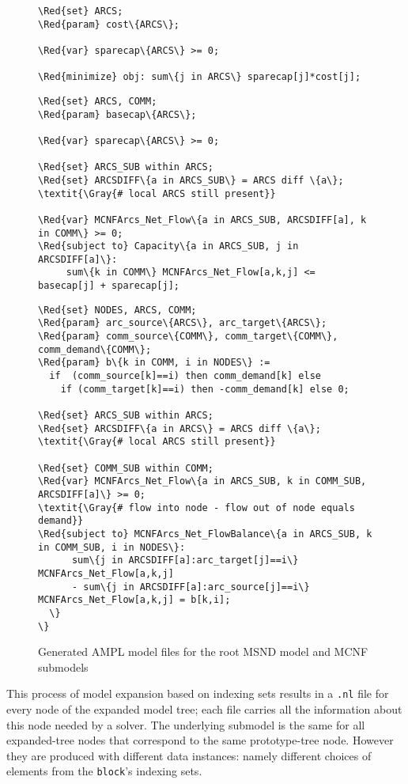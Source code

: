 \documentclass[10pt,a4paper]{book}
\begin{document}
\begin{figure}
{\small
\begin{Verbatim}[frame=single,framerule=0.2pt,framesep=5pt,commandchars=\\\{\}]
%------------------------------- root.mod --------------------------------
\Red{set} ARCS;
\Red{param} cost\{ARCS\};

\Red{var} sparecap\{ARCS\} >= 0;

\Red{minimize} obj: sum\{j in ARCS\} sparecap[j]*cost[j];
\end{Verbatim}
\begin{Verbatim}[frame=single,framerule=0.2pt,framesep=5pt,commandchars=\\\{\}]
% -------------------------- root_MCNFArcs.mod ----------------------------
\Red{set} ARCS, COMM;
\Red{param} basecap\{ARCS\};

\Red{var} sparecap\{ARCS\} >= 0;

\Red{set} ARCS_SUB within ARCS;
\Red{set} ARCSDIFF\{a in ARCS_SUB\} = ARCS diff \{a\};  \textit{\Gray{# local ARCS still present}}

\Red{var} MCNFArcs_Net_Flow\{a in ARCS_SUB, ARCSDIFF[a], k in COMM\} >= 0;
\Red{subject to} Capacity\{a in ARCS_SUB, j in ARCSDIFF[a]\}:
     sum\{k in COMM\} MCNFArcs_Net_Flow[a,k,j] <= basecap[j] + sparecap[j];
\end{Verbatim}
\begin{Verbatim}[frame=single,framerule=0.2pt,framesep=5pt,commandchars=\\\{\}]
% -------------------------- root_MCNFArcs_Net.mod ----------------------------
\Red{set} NODES, ARCS, COMM;
\Red{param} arc_source\{ARCS\}, arc_target\{ARCS\};
\Red{param} comm_source\{COMM\}, comm_target\{COMM\}, comm_demand\{COMM\};
\Red{param} b\{k in COMM, i in NODES\} := 
  if  (comm_source[k]==i) then comm_demand[k] else 
    if (comm_target[k]==i) then -comm_demand[k] else 0;

\Red{set} ARCS_SUB within ARCS;
\Red{set} ARCSDIFF\{a in ARCS\} = ARCS diff \{a\};  \textit{\Gray{# local ARCS still present}}

\Red{set} COMM_SUB within COMM;
\Red{var} MCNFArcs_Net_Flow\{a in ARCS_SUB, k in COMM_SUB, ARCSDIFF[a]\} >= 0;
\textit{\Gray{# flow into node - flow out of node equals demand}} 
\Red{subject to} MCNFArcs_Net_FlowBalance\{a in ARCS_SUB, k in COMM_SUB, i in NODES\}:
      sum\{j in ARCSDIFF[a]:arc_target[j]==i\} MCNFArcs_Net_Flow[a,k,j]  
      - sum\{j in ARCSDIFF[a]:arc_source[j]==i\} MCNFArcs_Net_Flow[a,k,j] = b[k,i];  
  \}
\}
\end{Verbatim}
\caption{Generated AMPL model files for the root MSND model and MCNF submodels}
\label{AMPLsubmodMCNF}
}
\end{figure}
%
This process of model expansion based on indexing sets results
in a {\tt *.nl} file for every node of the expanded model
tree; each file carries all the information about this node needed by a
solver. The underlying submodel is the same for all expanded-tree
nodes that correspond to the same prototype-tree node. However
they are produced with different data instances: namely different
choices of elements from the {\tt block}'s indexing sets.
\end{document}
